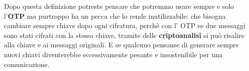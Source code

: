 \documentclass{report}
\begin{document}
Dopo questa definizione potreste pensare che potremmo usare sempre e solo l'\textbf{OTP} ma purtroppo ha un pecca che lo rende inutilizzabile: che bisogna cambiare sempre chiave dopo ogni cifratura, perchè con l' OTP se due messaggi sono stati cifrati con la stessa chiave, tramite delle \textbf{criptoanalisi} si può risalire alla chiave e ai messaggi originali. E se qualcuno pensanse di generare sempre nuovi chiavi diventerebbe eccessivamente pesante e insostenibile per una comunicazione.
\end{document}
